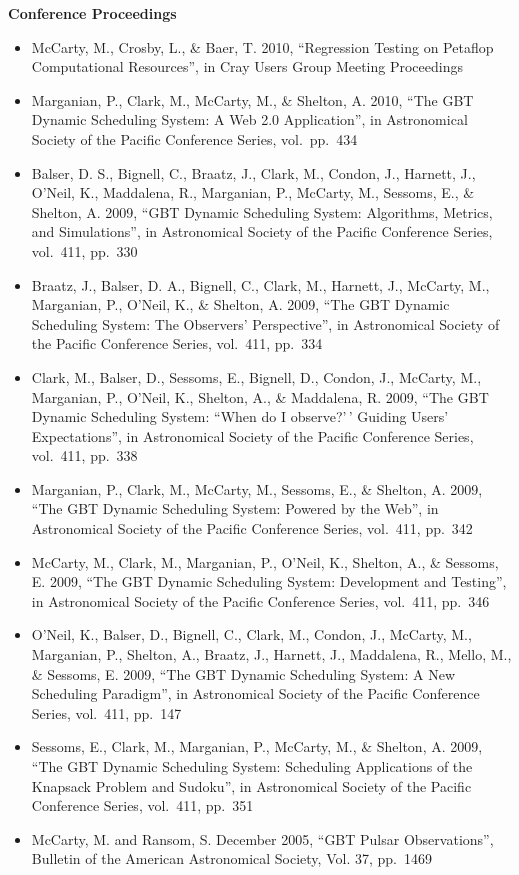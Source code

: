 \textbf{Conference Proceedings}

\begin{itemize}
\tightlist
\item
  McCarty, M., Crosby, L., \& Baer, T. 2010, ``Regression Testing on
  Petaflop Computational Resources'', in Cray Users Group Meeting
  Proceedings
\item
  Marganian, P., Clark, M., McCarty, M., \& Shelton, A. 2010, ``The GBT
  Dynamic Scheduling System: A Web 2.0 Application'', in Astronomical
  Society of the Pacific Conference Series, vol.~pp.~434
\item
  Balser, D. S., Bignell, C., Braatz, J., Clark, M., Condon, J.,
  Harnett, J., O'Neil, K., Maddalena, R., Marganian, P., McCarty, M.,
  Sessoms, E., \& Shelton, A. 2009, ``GBT Dynamic Scheduling System:
  Algorithms, Metrics, and Simulations'', in Astronomical Society of the
  Pacific Conference Series, vol.~411, pp.~330
\item
  Braatz, J., Balser, D. A., Bignell, C., Clark, M., Harnett, J.,
  McCarty, M., Marganian, P., O'Neil, K., \& Shelton, A. 2009, ``The GBT
  Dynamic Scheduling System: The Observers' Perspective'', in
  Astronomical Society of the Pacific Conference Series, vol.~411,
  pp.~334
\item
  Clark, M., Balser, D., Sessoms, E., Bignell, D., Condon, J., McCarty,
  M., Marganian, P., O'Neil, K., Shelton, A., \& Maddalena, R. 2009,
  ``The GBT Dynamic Scheduling System: ``When do I observe?'\,' Guiding
  Users' Expectations'', in Astronomical Society of the Pacific
  Conference Series, vol.~411, pp.~338
\item
  Marganian, P., Clark, M., McCarty, M., Sessoms, E., \& Shelton, A.
  2009, ``The GBT Dynamic Scheduling System: Powered by the Web'', in
  Astronomical Society of the Pacific Conference Series, vol.~411,
  pp.~342
\item
  McCarty, M., Clark, M., Marganian, P., O'Neil, K., Shelton, A., \&
  Sessoms, E. 2009, ``The GBT Dynamic Scheduling System: Development and
  Testing'', in Astronomical Society of the Pacific Conference Series,
  vol.~411, pp.~346
\item
  O'Neil, K., Balser, D., Bignell, C., Clark, M., Condon, J., McCarty,
  M., Marganian, P., Shelton, A., Braatz, J., Harnett, J., Maddalena,
  R., Mello, M., \& Sessoms, E. 2009, ``The GBT Dynamic Scheduling
  System: A New Scheduling Paradigm'', in Astronomical Society of the
  Pacific Conference Series, vol.~411, pp.~147
\item
  Sessoms, E., Clark, M., Marganian, P., McCarty, M., \& Shelton, A.
  2009, ``The GBT Dynamic Scheduling System: Scheduling Applications of
  the Knapsack Problem and Sudoku'', in Astronomical Society of the
  Pacific Conference Series, vol.~411, pp.~351
\item
  McCarty, M. and Ransom, S. December 2005, ``GBT Pulsar Observations'',
  Bulletin of the American Astronomical Society, Vol. 37, pp.~1469
\end{itemize}
